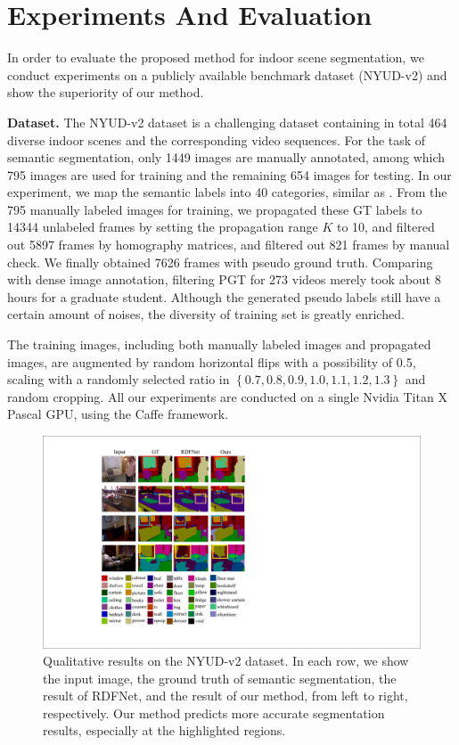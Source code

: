 \section{Experiments And Evaluation}
\label{sec:exper}
In order to evaluate the proposed method for indoor scene segmentation, we conduct experiments on a publicly available benchmark dataset (NYUD-v2) and show the superiority of our method.

\noindent\textbf{Dataset.}  
The NYUD-v2 dataset is a challenging dataset containing in total 464 diverse indoor scenes and the corresponding video sequences. 
%
For the task of semantic segmentation, only 1449 images are manually annotated, among which 795 images are used for training and the remaining 654 images for testing.
%
In our experiment, we map the semantic labels into 40 categories, similar as \cite{Gupta2014}.
%
From the 795 manually labeled images for training, we propagated these GT labels to 14344 unlabeled frames by setting the propagation range $K$ to 10, and filtered out 5897 frames by homography matrices, and filtered out 821 frames by manual check. 
We finally obtained 7626 frames with pseudo ground truth. 
%
Comparing with dense image annotation, filtering PGT for 273 videos merely took about 8 hours for a graduate student.
%
Although the generated pseudo labels still have a certain amount of noises, the diversity of training set is greatly enriched. 

The training images, including both manually labeled images and propagated images, are augmented by random horizontal flips with a possibility of 0.5, scaling with a randomly selected ratio in $\left\{0.7,0.8,0.9,1.0,1.1,1.2,1.3\right\}$ and random cropping. 
%
All our experiments are conducted on a single Nvidia Titan X Pascal GPU, using the Caffe framework.

\begin{figure}[!th]
	\centering
	\includegraphics[width=\columnwidth]{figure/Result.pdf}
	\caption{Qualitative results on the NYUD-v2 dataset. In each row, we show the input image, the ground truth of semantic segmentation, the result of RDFNet, and the result of our method, from left to right, respectively. Our method predicts more accurate segmentation results, especially at the highlighted regions.}
	\label{fig:VisResult}
	\vspace*{-0.3cm}
\end{figure}


